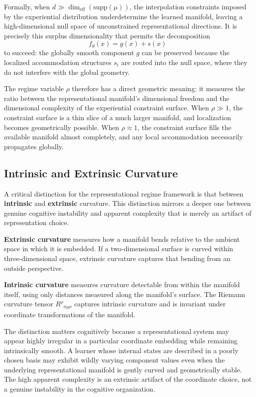 \documentclass[12pt,a4paper]{article}
\begin{document}
Formally, when $d \gg \dim_{\text{eff}}(\text{supp}(\mu))$, the interpolation constraints imposed by the experiential distribution underdetermine the learned manifold, leaving a high-dimensional null space of unconstrained representational directions. It is precisely this surplus dimensionality that permits the decomposition
\[
f_\theta(x) = g(x) + s(x)
\]
to succeed: the globally smooth component $g$ can be preserved because the localized accommodation structures $s_i$ are routed into the null space, where they do not interfere with the global geometry.

The regime variable $\rho$ therefore has a direct geometric meaning: it measures the ratio between the representational manifold's dimensional freedom and the dimensional complexity of the experiential constraint surface. When $\rho \gg 1$, the constraint surface is a thin slice of a much larger manifold, and localization becomes geometrically possible. When $\rho \approx 1$, the constraint surface fills the available manifold almost completely, and any local accommodation necessarily propagates globally.

\subsection{Intrinsic and Extrinsic Curvature}

A critical distinction for the representational regime framework is that between \textbf{intrinsic} and \textbf{extrinsic} curvature. This distinction mirrors a deeper one between genuine cognitive instability and apparent complexity that is merely an artifact of representation choice.

\textbf{Extrinsic curvature} measures how a manifold bends relative to the ambient space in which it is embedded. If a two-dimensional surface is curved within three-dimensional space, extrinsic curvature captures that bending from an outside perspective.

\textbf{Intrinsic curvature} measures curvature detectable from within the manifold itself, using only distances measured along the manifold's surface. The Riemann curvature tensor $R^\rho{}_{\sigma\mu\nu}$ captures intrinsic curvature and is invariant under coordinate transformations of the manifold.

The distinction matters cognitively because a representational system may appear highly irregular in a particular coordinate embedding while remaining intrinsically smooth. A learner whose internal states are described in a poorly chosen basis may exhibit wildly varying component values even when the underlying representational manifold is gently curved and geometrically stable. The high apparent complexity is an extrinsic artifact of the coordinate choice, not a genuine instability in the cognitive organization.
\end{document}
